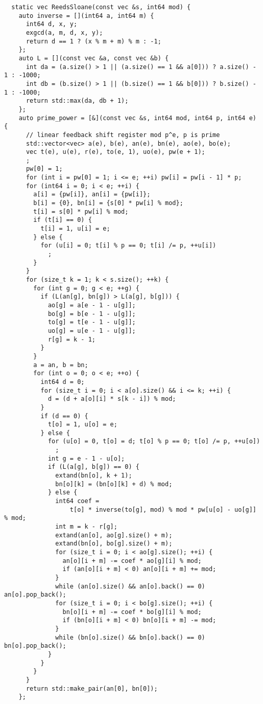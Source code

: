 \documentclass[twoside]{article}
\begin{document}
\begin{lstlisting}
  static vec ReedsSloane(const vec &s, int64 mod) {
    auto inverse = [](int64 a, int64 m) {
      int64 d, x, y;
      exgcd(a, m, d, x, y);
      return d == 1 ? (x % m + m) % m : -1;
    };
    auto L = [](const vec &a, const vec &b) {
      int da = (a.size() > 1 || (a.size() == 1 && a[0])) ? a.size() - 1 : -1000;
      int db = (b.size() > 1 || (b.size() == 1 && b[0])) ? b.size() - 1 : -1000;
      return std::max(da, db + 1);
    };
    auto prime_power = [&](const vec &s, int64 mod, int64 p, int64 e) {
      // linear feedback shift register mod p^e, p is prime
      std::vector<vec> a(e), b(e), an(e), bn(e), ao(e), bo(e);
      vec t(e), u(e), r(e), to(e, 1), uo(e), pw(e + 1);
      ;
      pw[0] = 1;
      for (int i = pw[0] = 1; i <= e; ++i) pw[i] = pw[i - 1] * p;
      for (int64 i = 0; i < e; ++i) {
        a[i] = {pw[i]}, an[i] = {pw[i]};
        b[i] = {0}, bn[i] = {s[0] * pw[i] % mod};
        t[i] = s[0] * pw[i] % mod;
        if (t[i] == 0) {
          t[i] = 1, u[i] = e;
        } else {
          for (u[i] = 0; t[i] % p == 0; t[i] /= p, ++u[i])
            ;
        }
      }
      for (size_t k = 1; k < s.size(); ++k) {
        for (int g = 0; g < e; ++g) {
          if (L(an[g], bn[g]) > L(a[g], b[g])) {
            ao[g] = a[e - 1 - u[g]];
            bo[g] = b[e - 1 - u[g]];
            to[g] = t[e - 1 - u[g]];
            uo[g] = u[e - 1 - u[g]];
            r[g] = k - 1;
          }
        }
        a = an, b = bn;
        for (int o = 0; o < e; ++o) {
          int64 d = 0;
          for (size_t i = 0; i < a[o].size() && i <= k; ++i) {
            d = (d + a[o][i] * s[k - i]) % mod;
          }
          if (d == 0) {
            t[o] = 1, u[o] = e;
          } else {
            for (u[o] = 0, t[o] = d; t[o] % p == 0; t[o] /= p, ++u[o])
              ;
            int g = e - 1 - u[o];
            if (L(a[g], b[g]) == 0) {
              extand(bn[o], k + 1);
              bn[o][k] = (bn[o][k] + d) % mod;
            } else {
              int64 coef =
                  t[o] * inverse(to[g], mod) % mod * pw[u[o] - uo[g]] % mod;
              int m = k - r[g];
              extand(an[o], ao[g].size() + m);
              extand(bn[o], bo[g].size() + m);
              for (size_t i = 0; i < ao[g].size(); ++i) {
                an[o][i + m] -= coef * ao[g][i] % mod;
                if (an[o][i + m] < 0) an[o][i + m] += mod;
              }
              while (an[o].size() && an[o].back() == 0) an[o].pop_back();
              for (size_t i = 0; i < bo[g].size(); ++i) {
                bn[o][i + m] -= coef * bo[g][i] % mod;
                if (bn[o][i + m] < 0) bn[o][i + m] -= mod;
              }
              while (bn[o].size() && bn[o].back() == 0) bn[o].pop_back();
            }
          }
        }
      }
      return std::make_pair(an[0], bn[0]);
    };


\end{lstlisting}
\end{document}
